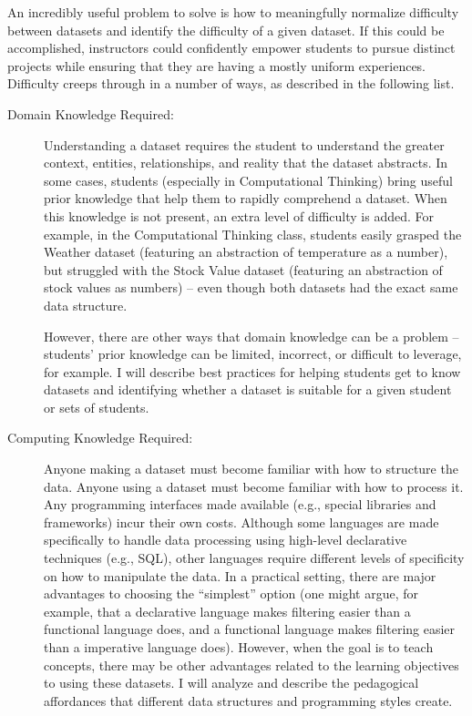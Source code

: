 An incredibly useful problem to solve is how to meaningfully normalize difficulty between datasets and identify the difficulty of a given dataset. If this could be accomplished, instructors could confidently empower students to pursue distinct projects while ensuring that they are having a mostly uniform experiences. Difficulty creeps through in a number of ways, as described in the following list. \begin{description}
	  \item[Domain Knowledge Required:] Understanding a dataset requires the student to understand the greater context, entities, relationships, and reality that the dataset abstracts. In some cases, students (especially in Computational Thinking) bring useful prior knowledge that help them to rapidly comprehend a dataset. When this knowledge is not present, an extra level of difficulty is added. For example, in the Computational Thinking class, students easily grasped the Weather dataset (featuring an abstraction of temperature as a number), but struggled with the Stock Value dataset (featuring an abstraction of stock values as numbers) -- even though both datasets had the exact same data structure.
		
		However, there are other ways that domain knowledge can be a problem -- students' prior knowledge can be limited, incorrect, or difficult to leverage, for example. I will describe best practices for helping students get to know datasets and identifying whether a dataset is suitable for a given student or sets of students.
		\item[Computing Knowledge Required:] Anyone making a dataset must become familiar with how to structure the data. Anyone using a dataset must become familiar with how to process it. Any programming interfaces made available (e.g., special libraries and frameworks) incur their own costs. Although some languages are made specifically to handle data processing using high-level declarative techniques (e.g., SQL), other languages require different levels of specificity on how to manipulate the data. In a practical setting, there are major advantages to choosing the ``simplest'' option (one might argue, for example, that a declarative language makes filtering easier than a functional language does, and a functional language makes filtering easier than a imperative language does). However, when the goal is to teach concepts, there may be other advantages related to the learning objectives to using these datasets. I will analyze and describe the pedagogical affordances that different data structures and programming styles create.
		

\end{description}
